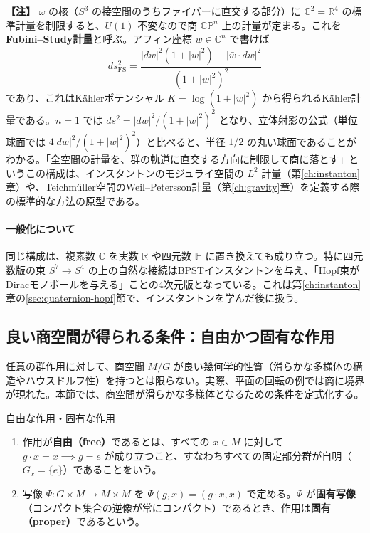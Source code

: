 \documentclass[uplatex, dvipdfmx, book]{jsbook}
\let\origsubsection\subsection
\let\origsubsubsection\subsubsection
\renewcommand{\section}{\origsubsection}
\renewcommand{\subsection}{\origsubsubsection}
\renewcommand{\subsubsection}{\paragraph}
\newenvironment{note}{\vspace{1ex}\par\footnotesize\noindent\textbf{【注】}}{\par\vspace{1ex}}
\begin{document}
\begin{note}
$\omega$ の核（$S^3$ の接空間のうちファイバーに直交する部分）に $\mathbb{C}^2 = \mathbb{R}^4$ の標準計量を制限すると、$U(1)$ 不変なので商 $\mathbb{CP}^n$ 上の計量が定まる。これを\textbf{Fubini--Study計量}と呼ぶ。アフィン座標 $w \in \mathbb{C}^n$ で書けば
\begin{equation*}
    ds^2_{\text{FS}} = \frac{|dw|^2 (1 + |w|^2) - |\bar{w} \cdot dw|^2}{(1 + |w|^2)^2}
\end{equation*}
であり、これはK\"ahlerポテンシャル $K = \log(1 + |w|^2)$ から得られるK\"ahler計量である。$n = 1$ では $ds^2 = |dw|^2/(1 + |w|^2)^2$ となり、立体射影の公式（単位球面では $4|dw|^2/(1 + |w|^2)^2$）と比べると、半径 $1/2$ の丸い球面であることがわかる。「全空間の計量を、群の軌道に直交する方向に制限して商に落とす」というこの構成は、インスタントンのモジュライ空間の $L^2$ 計量（第\ref{ch:instanton}章）や、Teichm\"uller空間のWeil--Petersson計量（第\ref{ch:gravity}章）を定義する際の標準的な方法の原型である。
\end{note}

\paragraph{一般化について}
同じ構成は、複素数 $\mathbb{C}$ を実数 $\mathbb{R}$ や四元数 $\mathbb{H}$ に置き換えても成り立つ。特に四元数版の束 $S^7 \to S^4$ の上の自然な接続はBPSTインスタントンを与え、「Hopf束がDiracモノポールを与える」ことの4次元版となっている。これは第\ref{ch:instanton}章の\ref{sec:quaternion-hopf}節で、インスタントンを学んだ後に扱う。


\section{良い商空間が得られる条件：自由かつ固有な作用}

任意の群作用に対して、商空間 $M/G$ が良い幾何学的性質（滑らかな多様体の構造やハウスドルフ性）を持つとは限らない。実際、平面の回転の例では商に境界が現れた。本節では、商空間が滑らかな多様体となるための条件を定式化する。

\begin{mydef}{自由な作用・固有な作用}{}
\begin{enumerate}
    \item 作用が\textbf{自由（free）}であるとは、すべての $x \in M$ に対して $g \cdot x = x \implies g = e$ が成り立つこと、すなわちすべての固定部分群が自明（$G_x = \{e\}$）であることをいう。
    \item 写像 $\Psi: G \times M \to M \times M$ を $\Psi(g, x) = (g \cdot x, x)$ で定める。$\Psi$ が\textbf{固有写像}（コンパクト集合の逆像が常にコンパクト）であるとき、作用は\textbf{固有（proper）}であるという。
\end{enumerate}
\end{mydef}
\end{document}

